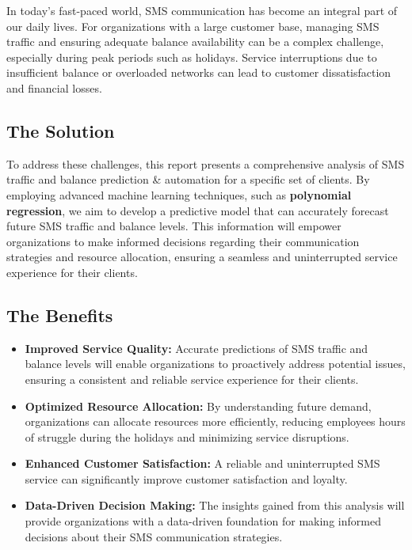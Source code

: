 \documentclass[12pt]{book} %
\begin{document}
In today's fast-paced world, SMS communication has become an integral part of our daily lives. For organizations with a large customer base, managing SMS traffic and ensuring adequate balance availability can be a complex challenge, especially during peak periods such as holidays. Service interruptions due to insufficient balance or overloaded networks can lead to customer dissatisfaction and financial losses.

\subsection{The Solution}

To address these challenges, this report presents a comprehensive analysis of SMS traffic and balance prediction \& automation for a specific set of clients. By employing advanced machine learning techniques, such as \textbf{polynomial regression}, we aim to develop a predictive model that can accurately forecast future SMS traffic and balance levels. This information will empower organizations to make informed decisions regarding their communication strategies and resource allocation, ensuring a seamless and uninterrupted service experience for their clients.

\subsection{The Benefits}
\begin{itemize}
		\item \textbf{Improved Service Quality:} Accurate predictions of SMS traffic and balance levels will enable organizations to proactively address potential issues, ensuring a consistent and reliable service experience for their clients.
        \item \textbf{Optimized Resource Allocation:}  By understanding future demand, organizations can allocate resources more efficiently, reducing employees hours of struggle during the holidays and minimizing service disruptions.
        \item \textbf{Enhanced Customer Satisfaction:} A reliable and uninterrupted SMS service can significantly improve customer satisfaction and loyalty.
        \item \textbf{Data-Driven Decision Making:} The insights gained from this analysis will provide organizations with a data-driven foundation for making informed decisions about their SMS communication strategies.
\end{itemize}
\end{document}

